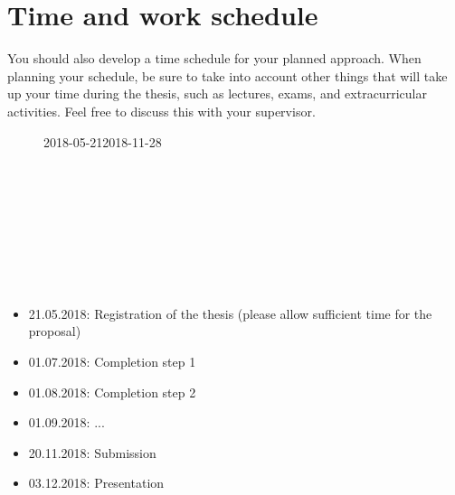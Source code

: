 \documentclass[a4paper, 11pt]{article}
\begin{document}
\section {Time and work schedule}
\label{schedule}
You should also develop a time schedule for your planned approach. When planning your schedule, be sure to take into account other things that will take up your time during the thesis, such as lectures, exams, and extracurricular activities. Feel free to discuss this with your supervisor.
\begin{figure}[h]
	\centering
	\def\pgfcalendarmonthshortgerman#1{%
		\ifcase#1 Dez\or Jan\or Feb\or Mär\or Apr\or Mai\or Jun\or Jul\or Aug\or Sept\or Okt\or Nov\or Dez\fi%
	}

	\begin{ganttchart}[
		title/.append style={fill=black!10},
		x unit=1.8pt,
		time slot format=isodate,
		milestone/.append style={ultra thick}
		]{2018-05-21}{2018-11-28}
			{}
			{}
		\\
		\\
		\\
		\\
		\\
		\\
		\\
		\\
		\\
	\end{ganttchart}
	\caption{}
\end{figure}
\begin{itemize}
	\item 21.05.2018: Registration of the thesis (please allow sufficient time for the proposal)
	\item 01.07.2018: Completion step 1
	\item 01.08.2018: Completion step 2
	\item 01.09.2018: ...
	\item 20.11.2018: Submission
	\item 03.12.2018: Presentation
\end{itemize}
\end{document}
